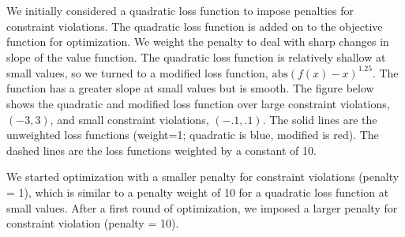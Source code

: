 \documentclass[12pt, oneside]{article}   	%
\begin{document}
We initially considered a quadratic loss function to impose penalties for constraint violations. The quadratic loss function is added on to the objective function for optimization. We weight the penalty to deal with sharp changes in slope of the value function. The quadratic loss function is relatively shallow at small values, so we turned to a modified loss function, $\mathrm{abs}( f(x) - x )^{1.25} $. The function has a greater slope at small values but is smooth. The figure below shows the quadratic and modified loss function over large constraint violations, $(-3,3)$, and small constraint violations, $(-.1,.1)$. The solid lines are the unweighted loss functions (weight=1; quadratic is blue, modified is red). The dashed lines are the loss functions weighted by a constant of 10. 

We started optimization with a smaller penalty for constraint violations (penalty = 1), which is similar to a penalty weight of 10 for a quadratic loss function at small values. After a first round of optimization, we imposed a larger penalty for constraint violation (penalty = 10).



\end{document}
